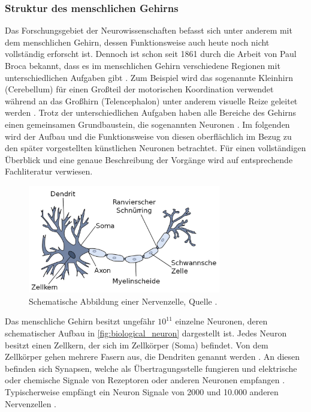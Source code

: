 \subsubsection{Struktur des menschlichen Gehirns}
Das Forschungsgebiet der Neurowissenschaften befasst sich unter anderem mit dem menschlichen Gehirn, dessen Funktionsweise auch heute noch nicht vollständig erforscht ist. Dennoch ist schon seit 1861 durch die Arbeit von Paul Broca bekannt, dass es im menschlichen Gehirn verschiedene Regionen mit unterschiedlichen Aufgaben gibt \cite{russell2013kunstliche}. Zum Beispiel wird das sogenannte Kleinhirn (Cerebellum) für einen Großteil der motorischen Koordination verwendet während an das Großhirn (Telencephalon) unter anderem visuelle Reize geleitet werden \cite{kriesel2008kleiner}. Trotz der unterschiedlichen Aufgaben haben alle Bereiche des Gehirns einen gemeinsamen Grundbaustein, die sogenannten Neuronen \cite{russell2013kunstliche}. Im folgenden wird der Aufbau und die Funktionsweise von diesen oberflächlich im Bezug zu den später vorgestellten künstlichen Neuronen betrachtet. Für einen vollständigen Überblick und eine genaue Beschreibung der Vorgänge wird auf entsprechende Fachliteratur verwiesen.\\
\begin{figure}[h]
	\centering
	\includegraphics[width=0.75\textwidth]{./img/biologial_neuron.JPG} 
	\caption{Schematische Abbildung einer Nervenzelle, Quelle \cite{kriesel2008kleiner}.}
	\label{fig:biological_neuron}
\end{figure}
Das menschliche Gehirn besitzt ungefähr ${10}^{11}$ einzelne Neuronen, deren schematischer Aufbau in \autoref{fig:biological_neuron} dargestellt ist. Jedes Neuron besitzt einen Zellkern, der sich im Zellkörper (Soma) befindet. Von dem Zellkörper gehen mehrere Fasern aus, die Dendriten genannt werden \cite{russell2013kunstliche}. An diesen befinden sich Synapsen, welche als Übertragungsstelle fungieren und elektrische oder chemische Signale von Rezeptoren oder anderen Neuronen empfangen \cite{kriesel2008kleiner}. Typischerweise empfängt ein Neuron Signale von 2000 und 10.000 anderen Nervenzellen \cite{zell2003simulation}. \\

